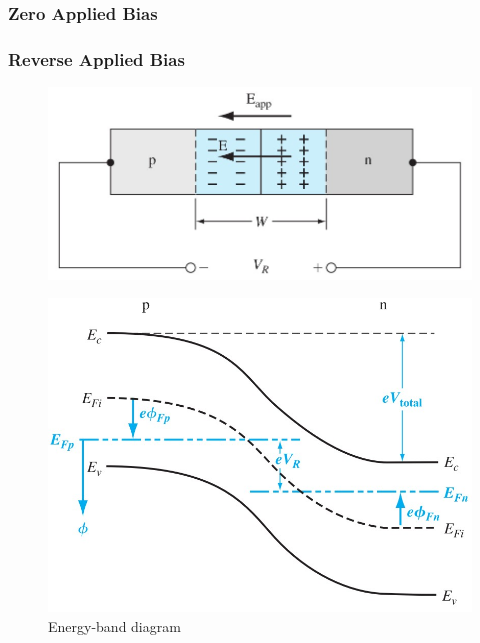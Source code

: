 \documentclass{beamer}
\begin{document}
    \begin{frame} \frametitle{Zero Applied Bias}
    \end{frame}

    \begin{frame} \frametitle{Reverse Applied Bias}
        \begin{figure}[H]
            \centering
            \includegraphics[width=0.5\linewidth]{Reversed-biase-graph.jpg}
            \label{fig:Reversed-biase-graph.jpg}
        \end{figure}
        \begin{figure}[H]
            \centering
            \includegraphics[width=0.5\linewidth]{Energy-band-diagram-reversed-biase.jpg}
            \caption{Energy-band diagram}
            \label{fig:Energy-band-diagram-reversed-biase.jpg}
        \end{figure}
    \end{frame}
\end{document}

